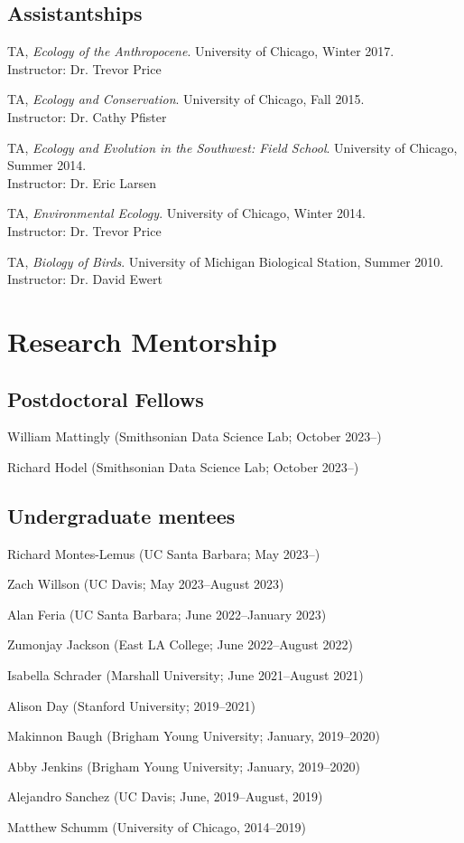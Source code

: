 \documentclass[letterpaper]{article}
\renewenvironment{itemize}{
  \begin{list}{}{
    \setlength{\leftmargin}{1.5em}
  }
}{
  \end{list}
}
\newenvironment{biblist}{%
   \begin{list}{}{%
     \setlength{\labelwidth}{0pt}%
     \setlength{\labelsep}{1em}%
     \setlength{\leftmargin}{2em}%
     \setlength{\itemindent}{-1em}%
   }
}{\end{list}}
\begin{document}
\subsection*{Assistantships}
\begin{biblist}
\item TA, \textit{Ecology of the Anthropocene}. University of Chicago, Winter 2017. 
\\Instructor: Dr. Trevor Price
\item TA, \textit{Ecology and Conservation}. University of Chicago, Fall 2015. 
\\Instructor: Dr. Cathy Pfister
\item TA, \textit{Ecology and Evolution in the Southwest: Field School}. University of Chicago, Summer 2014.
\\Instructor: Dr. Eric Larsen
\item TA, \textit{Environmental Ecology}. University of Chicago, Winter 2014. 
\\Instructor: Dr. Trevor Price
\item TA, \textit{Biology of Birds}. University of Michigan Biological Station, Summer 2010. 
\\Instructor: Dr. David Ewert
\end{biblist}

\section*{Research Mentorship}
\subsection*{Postdoctoral Fellows}
\begin{itemize}
\item William Mattingly (Smithsonian Data Science Lab; October 2023--)
\item Richard Hodel (Smithsonian Data Science Lab; October 2023--)
\end{itemize}
\subsection*{Undergraduate mentees}
\begin{itemize}
\item Richard Montes-Lemus (UC Santa Barbara; May 2023--)
\item Zach Willson (UC Davis; May 2023--August 2023)
\item Alan Feria (UC Santa Barbara; June 2022--January 2023)
\item Zumonjay Jackson (East LA College; June 2022--August 2022)
\item Isabella Schrader (Marshall University; June 2021--August 2021)
\item Alison Day (Stanford University; 2019--2021)
\item Makinnon Baugh (Brigham Young University; January, 2019--2020)
\item Abby Jenkins (Brigham Young University; January, 2019--2020)
\item Alejandro Sanchez (UC Davis; June, 2019--August, 2019)
\item Matthew Schumm (University of Chicago, 2014--2019)
\end{itemize}
\end{document}
